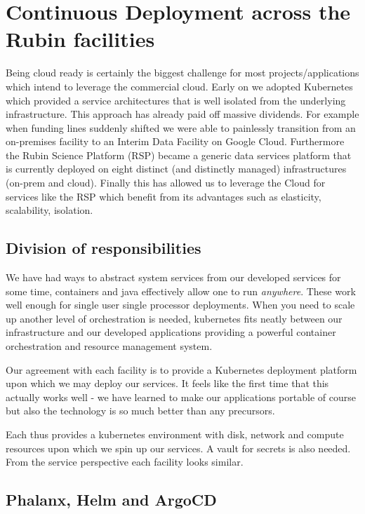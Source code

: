 \section{Continuous Deployment across the Rubin facilities} \label{sec:deploy}

Being cloud ready is certainly the biggest challenge for most projects/applications which intend to leverage the commercial cloud.
Early on we adopted Kubernetes which provided a service architectures that is well isolated from the underlying infrastructure.
This approach has already paid off massive dividends.
For example when funding lines suddenly shifted we were able to painlessly transition from an on-premises facility to an Interim Data Facility on Google Cloud.
Furthermore the Rubin Science Platform (RSP) became a generic data services platform that is currently deployed on eight distinct (and distinctly managed) infrastructures (on-prem and cloud).
Finally this has allowed us to leverage the Cloud for services like the RSP which benefit from its advantages such as elasticity, scalability, isolation.




\subsection{Division of responsibilities}
We have had ways to abstract system services from our developed services for some time, containers and java effectively allow one to run \emph{anywhere}.
These work well enough for single user single processor deployments.
When you need to scale up another level of orchestration is needed, kubernetes fits neatly between our infrastructure and our developed applications providing a powerful container orchestration and resource management system.

Our agreement with each facility is to provide a Kubernetes deployment platform upon which we may deploy our services.
It feels like the first time that this actually works well - we have learned to make our applications portable of course but also the technology is so much better than any precursors.

Each thus provides a kubernetes environment with disk, network and compute resources upon which we spin up our services.
A vault for secrets is also needed.
From the service perspective each facility looks similar.

\subsection{Phalanx, Helm and ArgoCD}

